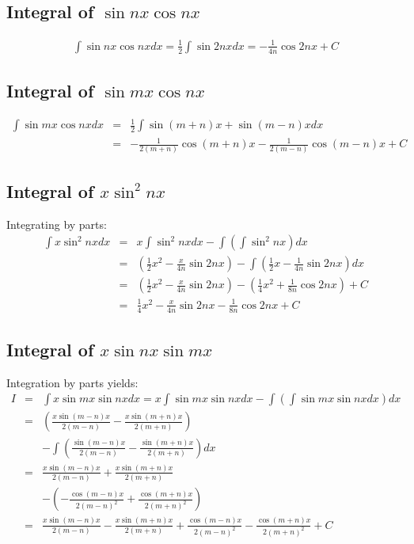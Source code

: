 \documentclass[12pt]{article}
\begin{document}
\subsection{Integral of $ \sin nx \cos nx $}
\begin{eqnarray*}
\int \sin nx \cos nx dx = \frac{1}{2} \int \sin 2nx dx = - \frac{1}{4n} \cos 2nx + C
\end{eqnarray*}

\subsection{Integral of $ \sin mx \cos nx $}
\begin{eqnarray*}
\int \sin mx \cos nx dx &=& \frac{1}{2} \int \sin (m+n) x + \sin (m-n) x dx \\
				&=& -\frac{1}{2(m+n)} \cos (m+n) x - \frac{1}{2(m-n)} \cos (m-n) x + C
\end{eqnarray*}



\subsection{Integral of $x \sin^2 nx$}
Integrating by parts: 
\begin{eqnarray*}
\int x \sin^2 nx dx &=& x \int \sin^2 nx dx - \int \left( \int \sin^2 nx \right) dx \\
		&=& \left( \frac{1}{2}x^2 - \frac{x}{4n} \sin 2nx \right) -
			\int \left( \frac{1}{2}x - \frac{1}{4n} \sin 2nx \right) dx \\
		&=& \left( \frac{1}{2}x^2 - \frac{x}{4n} \sin 2nx \right) - 
			\left(
				\frac{1}{4}x^2 + \frac{1}{8n} \cos 2nx 	
			\right) + C \\
		&=& \frac{1}{4} x^2 - \frac{x}{4n} \sin 2nx - \frac{1}{8n} \cos 2nx + C
\end{eqnarray*}


\subsection{Integral of $x \sin nx \sin mx$}
Integration by parts yields:
\begin{eqnarray*}
I &=& \int x \sin mx \sin nx dx = x \int \sin mx \sin nx dx - \int \left( \int \sin mx \sin nx dx \right) dx \\
	&=& \left(  \frac{x \sin(m-n)x}{2(m-n)} - \frac{x \sin(m+n)x}{2(m+n)} \right) \\
	&& - \int \left( \frac{\sin(m-n)x}{2(m-n)} - \frac{\sin(m+n)x}{2(m+n)} \right) dx \\
	&=&  \frac{x \sin(m-n)x}{2(m-n)}  + \frac{x \sin(m+n)x}{2(m+n)}  \\
	&& - \left( -\frac{\cos(m-n)x}{2(m-n)^2} + \frac{\cos(m+n)x}{2(m+n)^2}  \right) \\
	&=& \frac{x\sin(m-n) x}{2(m-n)}  - \frac{x \sin(m+n)x}{2(m+n)}  + \frac{\cos(m-n)x}{2(m-n)^2}  - \frac{\cos(m+n)x}{2(m+n)^2} + C
\end{eqnarray*}
\end{document}
